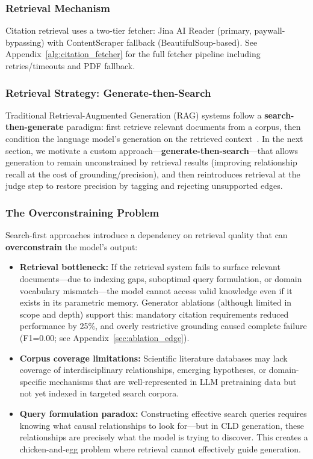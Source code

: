 \subsubsection{Retrieval Mechanism}

Citation retrieval uses a two-tier fetcher: Jina AI Reader (primary, paywall-bypassing) with ContentScraper fallback (BeautifulSoup-based). See Appendix~\ref{alg:citation_fetcher} for the full fetcher pipeline including retries/timeouts and PDF fallback.

\subsubsection{Retrieval Strategy: Generate-then-Search}
\label{sec:retrieval_strategy}

Traditional Retrieval-Augmented Generation (RAG) systems follow a \textbf{search-then-generate} paradigm: first retrieve relevant documents from a corpus, then condition the language model's generation on the retrieved context~\cite{lewis2020rag}. In the next section, we motivate a custom approach---\textbf{generate-then-search}---that allows generation to remain unconstrained by retrieval results (improving relationship recall at the cost of grounding/precision), and then reintroduces retrieval at the judge step to restore precision by tagging and rejecting unsupported edges.

\subsubsection{The Overconstraining Problem}

Search-first approaches introduce a dependency on retrieval quality that can \textbf{overconstrain} the model's output:

\begin{itemize}[noitemsep]
    \item \textbf{Retrieval bottleneck:} If the retrieval system fails to surface relevant documents---due to indexing gaps, suboptimal query formulation, or domain vocabulary mismatch---the model cannot access valid knowledge even if it exists in its parametric memory. Generator ablations (although limited in scope and depth) support this: mandatory citation requirements reduced performance by 25\%, and overly restrictive grounding caused complete failure (F1=0.00; see Appendix~\ref{sec:ablation_edge}).
    \item \textbf{Corpus coverage limitations:} Scientific literature databases may lack coverage of interdisciplinary relationships, emerging hypotheses, or domain-specific mechanisms that are well-represented in LLM pretraining data but not yet indexed in targeted search corpora.
    \item \textbf{Query formulation paradox:} Constructing effective search queries requires knowing what causal relationships to look for---but in CLD generation, these relationships are precisely what the model is trying to discover. This creates a chicken-and-egg problem where retrieval cannot effectively guide generation.
\end{itemize}

